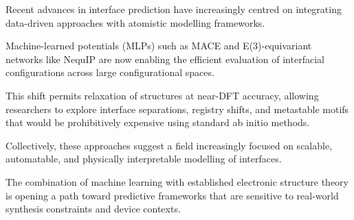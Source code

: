 
Recent advances in interface prediction have increasingly centred on integrating data-driven approaches with atomistic
modelling frameworks.

Machine-learned potentials (MLPs) such as MACE and E(3)-equivariant networks like NequIP are now enabling the efficient
evaluation of interfacial configurations across large configurational spaces.

This shift permits relaxation of structures at near-DFT accuracy, allowing researchers to explore interface separations,
registry shifts, and metastable motifs that would be prohibitively expensive using standard ab initio methods.


Collectively, these approaches suggest a field increasingly focused on scalable, automatable, and physically
interpretable modelling of interfaces.

The combination of machine learning with established electronic structure theory is opening a path toward predictive
frameworks that are sensitive to real-world synthesis constraints and device contexts.